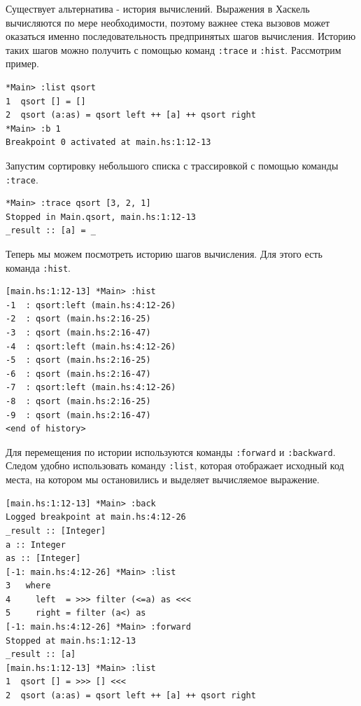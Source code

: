 \documentclass[fontsize=14pt, paper=a4, pagesize, DIV=calc]{scrartcl}
\def\code#1{\texttt{#1}}
\begin{document}
Существует альтернатива - история вычислений. Выражения в Хаскель вычисляются
по мере необходимости, поэтому важнее стека вызовов может оказаться именно
последовательность предпринятых шагов вычисления. Историю таких шагов можно
получить с помощью команд \code{:trace} и \code{:hist}. Рассмотрим пример.

\begin{ListingEnv}
\caption{}
\begin{lstlisting}[numbers=none]
*Main> :list qsort
1  qsort [] = []
2  qsort (a:as) = qsort left ++ [a] ++ qsort right
*Main> :b 1
Breakpoint 0 activated at main.hs:1:12-13
\end{lstlisting}
\end{ListingEnv}

Запустим сортировку небольшого списка с трассировкой с помощью команды \code{:trace}.

\begin{ListingEnv}
\caption{}
\begin{lstlisting}[numbers=none]
*Main> :trace qsort [3, 2, 1]
Stopped in Main.qsort, main.hs:1:12-13
_result :: [a] = _
\end{lstlisting}
\end{ListingEnv}

Теперь мы можем посмотреть историю шагов вычисления. Для этого есть команда
\code{:hist}.

\begin{ListingEnv}
\caption{}
\begin{lstlisting}[numbers=none]
[main.hs:1:12-13] *Main> :hist
-1  : qsort:left (main.hs:4:12-26)
-2  : qsort (main.hs:2:16-25)
-3  : qsort (main.hs:2:16-47)
-4  : qsort:left (main.hs:4:12-26)
-5  : qsort (main.hs:2:16-25)
-6  : qsort (main.hs:2:16-47)
-7  : qsort:left (main.hs:4:12-26)
-8  : qsort (main.hs:2:16-25)
-9  : qsort (main.hs:2:16-47)
<end of history> 
\end{lstlisting}
\end{ListingEnv}

Для перемещения по истории используются команды \code{:forward} и
\code{:backward}. Следом удобно использовать команду \code{:list}, которая
отображает исходный код места, на котором мы остановились и выделяет 
вычисляемое выражение.

\begin{ListingEnv}
\caption{}
\begin{lstlisting}[numbers=none]
[main.hs:1:12-13] *Main> :back
Logged breakpoint at main.hs:4:12-26
_result :: [Integer]
a :: Integer
as :: [Integer]
[-1: main.hs:4:12-26] *Main> :list
3   where
4     left  = >>> filter (<=a) as <<<
5     right = filter (a<) as
[-1: main.hs:4:12-26] *Main> :forward
Stopped at main.hs:1:12-13
_result :: [a]
[main.hs:1:12-13] *Main> :list
1  qsort [] = >>> [] <<<
2  qsort (a:as) = qsort left ++ [a] ++ qsort right
\end{lstlisting}
\end{ListingEnv}
\end{document}
